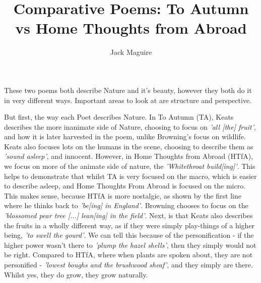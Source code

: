 \documentclass[12pt, oneside]{article}
\title{Comparative Poems: To Autumn vs Home Thoughts from Abroad}
\author{Jack Maguire}
\begin{document}
\maketitle
{}

These two poems both describe Nature and it's beauty, however they both do it in very different ways. Important areas to look at are structure and perspective.
\par
\bigskip



But first, the way each Poet describes Nature. In To Autumn (TA), Keats describes the more inanimate side of Nature, choosing to focus on \textit{'all [the] fruit'}, and how it is later harvested in the poem, unlike Browning's focus on wildlife. Keats also focuses lots on the humans in the scene, choosing to describe them as \textit{'sound asleep'}, and innocent. However, in Home Thoughts from Abroad (HTfA), we focus on more of the animate side of nature, the \textit{'Whitethroat build[ing]'}. This helps to demonstrate that whilst TA is very focused on the macro, which is easier to describe asleep, and Home Thoughts From Abroad is focused on the micro. This makes sense, because HTfA is more nostalgic, as shown by the first line where he thinks back to \textit{'be[ing] in England'}. Browning chooses to focus on the \textit{'blossomed pear tree [...] lean[ing] in the field'}. Next, is that Keats also describes the fruits in a wholly different way, as if they were simply play-things of a higher being, \textit{'to swell the gourd'}. We can tell this because of the personification - if the higher power wasn't there to \textit{'plump the hazel shells'}, then they simply would not be right. Compared to HTfA, where when plants are spoken about, they are not personified - \textit{'lowest boughs and the brushwood sheaf'}, and they simply are there. Whilst yes, they do grow, they grow naturally.
\par
\bigskip
\end{document}
